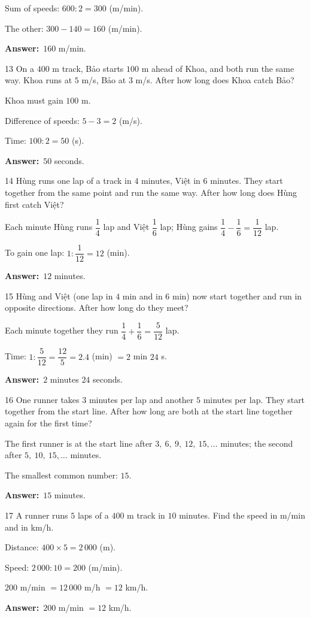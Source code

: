 \documentclass[11pt]{article}
\newif\ifsol \solfalse
\providecommand{\AnsWord}{Đáp số}
\newcommand{\dapso}[1]{\par\textbf{\AnsWord:}\ #1}
\newcommand{\probsol}[1]{%
  \begin{lrbox}{\solmeasure}\begin{minipage}{\dimexpr\linewidth-24pt\relax}#1\end{minipage}\end{lrbox}%
  \ifsol
    \begin{solbox}#1\end{solbox}%
  \else
    \setlength{\solht}{\dimexpr\ht\solmeasure+\dp\solmeasure+0.85cm\relax}%
    \ifdim\solht<1.35cm\setlength{\solht}{1.35cm}\fi
    \begin{tcolorbox}[colback=white,colframe=Line,boxrule=0.8pt,arc=5pt,
      left=8pt,right=8pt,top=4pt,bottom=4pt,height=\solht]{\footnotesize\color{Slate}\itshape\WorkWord}\end{tcolorbox}%
  \fi}
\newcommand{\gap}{\vspace{0.3cm}}
\def\WorkWord{Your work:}
\def\AnsWord{Answer}
\begin{document}
\probsol{
Sum of speeds: $600:2=300$ (m/min).\par The other: $300-140=160$ (m/min).
\dapso{$160$ m/min.}}
\gap
\begin{probbox}{13}{\relax}
On a $400$ m track, Bảo starts $100$ m ahead of Khoa, and both run the same way. Khoa runs at $5$ m/s, Bảo at $3$ m/s. After how long does Khoa catch Bảo?
\end{probbox}
\probsol{
Khoa must gain $100$ m.\par Difference of speeds: $5-3=2$ (m/s).\par Time: $100:2=50$ (s).
\dapso{$50$ seconds.}}
\gap
\begin{probbox}{14}{\relax}
Hùng runs one lap of a track in $4$ minutes, Việt in $6$ minutes. They start together from the same point and run the same way. After how long does Hùng first catch Việt?
\end{probbox}
\probsol{
Each minute Hùng runs $\dfrac14$ lap and Việt $\dfrac16$ lap; Hùng gains $\dfrac14-\dfrac16=\dfrac1{12}$ lap.\par
To gain one lap: $1:\dfrac1{12}=12$ (min).
\dapso{$12$ minutes.}}
\gap
\begin{probbox}{15}{\relax}
Hùng and Việt (one lap in $4$ min and in $6$ min) now start together and run in opposite directions. After how long do they meet?
\end{probbox}
\probsol{
Each minute together they run $\dfrac14+\dfrac16=\dfrac5{12}$ lap.\par
Time: $1:\dfrac5{12}=\dfrac{12}5=2.4$ (min) $=2$ min $24$ s.
\dapso{$2$ minutes $24$ seconds.}}
\gap
\begin{probbox}{16}{\relax}
One runner takes $3$ minutes per lap and another $5$ minutes per lap. They start together from the start line. After how long are both at the start line together again for the first time?
\end{probbox}
\probsol{
The first runner is at the start line after $3,\ 6,\ 9,\ 12,\ 15,\ldots$ minutes; the second after $5,\ 10,\ 15,\ldots$ minutes.\par
The smallest common number: $15$.
\dapso{$15$ minutes.}}
\gap
\begin{probbox}{17}{\relax}
A runner runs $5$ laps of a $400$ m track in $10$ minutes. Find the speed in m/min and in km/h.
\end{probbox}
\probsol{
Distance: $400\times5=2\,000$ (m).\par Speed: $2\,000:10=200$ (m/min).\par $200$ m/min $=12\,000$ m/h $=12$ km/h.
\dapso{$200$ m/min $=12$ km/h.}}
\end{document}
